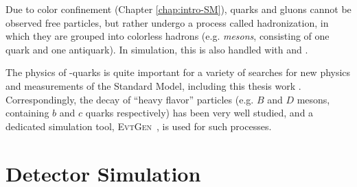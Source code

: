 Due to color confinement (Chapter \ref{chap:intro-SM}), quarks and gluons cannot be observed free particles, but 
rather undergo a process called hadronization, in which they are grouped into colorless hadrons (e.g. \emph{mesons},
consisting of one quark and one antiquark). In simulation, this is also handled with  and .

The physics of \Pqb-quarks is quite important for a variety of searches for new physics and measurements of 
the Standard Model, including this thesis work . Correspondingly, the decay of ``heavy flavor'' particles 
(e.g. $B$ and $D$ mesons, containing $b$ and $c$ quarks respectively) has been very well studied, and 
a dedicated simulation tool, \textsc{EvtGen}~\cite{EvtGen}, is used for such processes.


\section{Detector Simulation}
